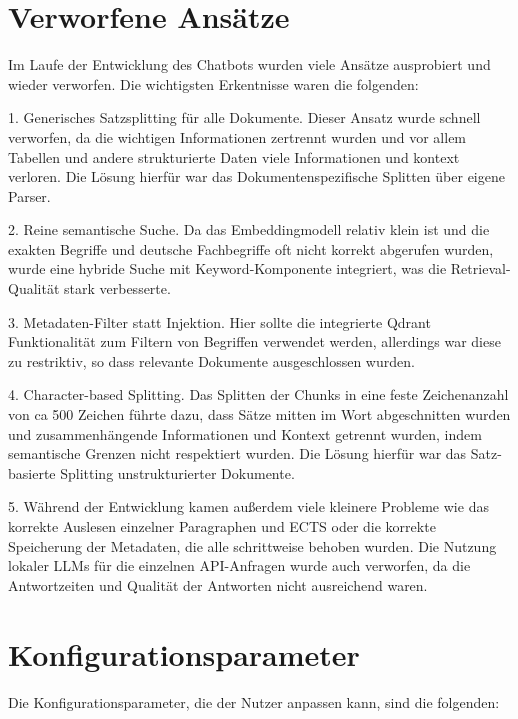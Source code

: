 \section{Verworfene Ansätze}
Im Laufe der Entwicklung des Chatbots wurden viele Ansätze ausprobiert und wieder verworfen. Die wichtigsten Erkentnisse waren die folgenden:

1. Generisches Satzsplitting für alle Dokumente. Dieser Ansatz wurde schnell verworfen, da die wichtigen Informationen zertrennt wurden und vor allem Tabellen und andere strukturierte Daten viele Informationen und kontext verloren. Die Lösung hierfür war das Dokumentenspezifische Splitten über eigene Parser.

2. Reine semantische Suche. Da das Embeddingmodell relativ klein ist und die exakten Begriffe und deutsche Fachbegriffe oft nicht korrekt abgerufen wurden, wurde eine hybride Suche mit Keyword-Komponente integriert, was die Retrieval-Qualität stark verbesserte. 

3. Metadaten-Filter statt Injektion. Hier sollte die integrierte Qdrant Funktionalität zum Filtern von Begriffen verwendet werden, allerdings war diese zu restriktiv, so dass relevante Dokumente ausgeschlossen wurden.

4. Character-based Splitting. Das Splitten der Chunks in eine feste Zeichenanzahl von ca 500 Zeichen führte dazu, dass Sätze mitten im Wort abgeschnitten wurden und zusammenhängende Informationen und 
Kontext getrennt wurden, indem semantische Grenzen nicht respektiert wurden. Die Lösung hierfür war das Satz-basierte Splitting unstrukturierter Dokumente.

5. Während der Entwicklung kamen außerdem viele kleinere Probleme wie das korrekte Auslesen einzelner Paragraphen und ECTS oder die korrekte Speicherung der Metadaten, die alle schrittweise behoben wurden. Die Nutzung lokaler LLMs für die einzelnen API-Anfragen wurde auch verworfen, da die Antwortzeiten und Qualität der Antworten nicht ausreichend waren.

\section{Konfigurationsparameter}

Die Konfigurationsparameter, die der Nutzer anpassen kann, sind die folgenden:

